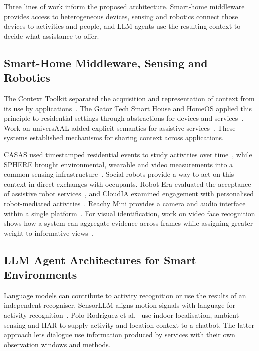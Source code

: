 \documentclass[a4paper,twoside]{article}
\begin{document}
Three lines of work inform the proposed architecture. Smart-home middleware provides access to heterogeneous devices, sensing and robotics connect those devices to activities and people, and LLM agents use the resulting context to decide what assistance to offer.

\subsection{Smart-Home Middleware, Sensing and Robotics}

The Context Toolkit separated the acquisition and representation of context from its use by applications~\cite{dey2001toolkit}. The Gator Tech Smart House and HomeOS applied this principle to residential settings through abstractions for devices and services~\cite{helal2005gator,dixon2012homeos}. Work on universAAL added explicit semantics for assistive services~\cite{zmuda2016universaal}. These systems established mechanisms for sharing context across applications.

CASAS used timestamped residential events to study activities over time~\cite{cook2013casas}, while SPHERE brought environmental, wearable and video measurements into a common sensing infrastructure~\cite{elsts2018sphere}. Social robots provide a way to act on this context in direct exchanges with occupants. Robot-Era evaluated the acceptance of assistive robot services~\cite{cavallo2018robotera}, and CloudIA examined engagement with personalised robot-mediated activities~\cite{sorrentino2023cloudia}. Reachy Mini provides a camera and audio interface within a single platform~\cite{danieau2026reachymedia}. For visual identification, work on video face recognition shows how a system can aggregate evidence across frames while assigning greater weight to informative views~\cite{yang2017nan}.

\subsection{LLM Agent Architectures for Smart Environments}
\label{subsec:related-llm}

Language models can contribute to activity recognition or use the results of an independent recogniser. SensorLLM aligns motion signals with language for activity recognition~\cite{li2025sensorllm}. Polo-Rodr\'iguez et al.~\cite{polo2025chatbots} use indoor localisation, ambient sensing and HAR to supply activity and location context to a chatbot. The latter approach lets dialogue use information produced by services with their own observation windows and methods.
\end{document}
